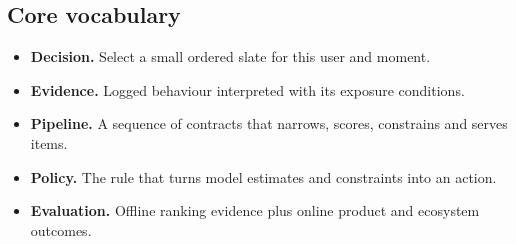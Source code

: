 \subsection{Core vocabulary}
\begin{itemize}
\item \textbf{Decision.} Select a small ordered slate for this user and moment.
\item \textbf{Evidence.} Logged behaviour interpreted with its exposure conditions.
\item \textbf{Pipeline.} A sequence of contracts that narrows, scores, constrains and serves items.
\item \textbf{Policy.} The rule that turns model estimates and constraints into an action.
\item \textbf{Evaluation.} Offline ranking evidence plus online product and ecosystem outcomes.
\end{itemize}
